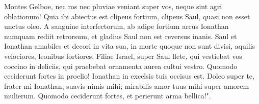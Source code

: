 \begin{biblechapter}
\verse Montes Gelboe, nec ros nec pluviae veniant super vos, neque sint agri oblationum! Quia ibi abiectus est clipeus fortium, clipeus Saul, quasi non esset unctus oleo. 
\verse A sanguine interfectorum, ab adipe fortium arcus Ionathan numquam rediit retrorsum, et gladius Saul non est reversus inanis. 
\verse Saul et Ionathan amabiles et decori in vita sua, in morte quoque non sunt divisi, aquilis velociores, leonibus fortiores. 
\verse Filiae Israel, super Saul flete, qui vestiebat vos coccino in deliciis, qui praebebat ornamenta aurea cultui vestro. 
\verse Quomodo ceciderunt fortes in proelio! Ionathan in excelsis tuis occisus est. 
\verse Doleo super te, frater mi Ionathan, suavis nimis mihi; mirabilis amor tuus mihi super amorem mulierum. 
\verse Quomodo ceciderunt fortes, et perierunt arma bellica!". 
\end{biblechapter}

